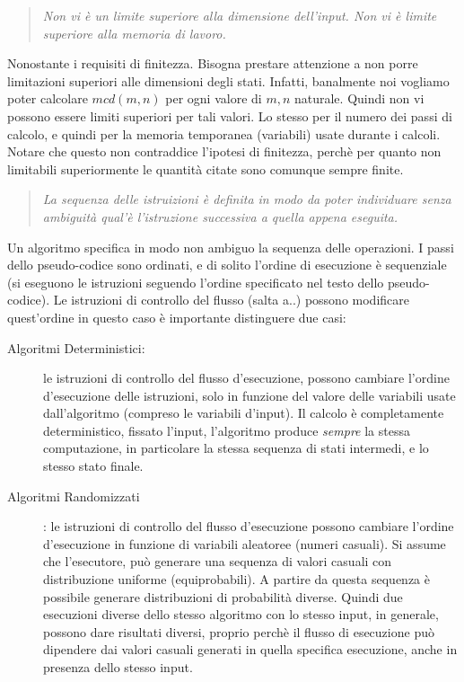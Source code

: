 \begin{quote} \emph{Non vi è un limite superiore alla dimensione
    dell'input. Non vi è limite superiore alla memoria di lavoro.}
\end{quote}

Nonostante i requisiti di finitezza. Bisogna prestare attenzione a non
porre limitazioni superiori alle dimensioni degli stati. Infatti,
banalmente noi vogliamo poter calcolare $mcd(m,n)$ per ogni valore di
$m,n$ naturale. Quindi non vi possono essere limiti superiori per tali
valori. Lo stesso per il numero dei passi di calcolo, e quindi per la
memoria temporanea (variabili) usate durante i calcoli. Notare che
questo non contraddice l'ipotesi di finitezza, perchè per quanto non
limitabili superiormente le quantità citate sono comunque sempre
finite.

\begin{quote} \emph{La sequenza delle istruizioni è definita in modo
    da poter individuare senza ambiguità qual'è l'istruzione
    successiva a quella appena eseguita.}
\end{quote}

Un algoritmo specifica in modo non ambiguo la sequenza delle
operazioni. I passi dello pseudo-codice sono ordinati, e di solito
l'ordine di esecuzione è sequenziale (si eseguono le istruzioni
seguendo l'ordine specificato nel testo dello pseudo-codice). Le
istruzioni di controllo del flusso (salta a..) possono modificare
quest'ordine in questo caso è importante distinguere due casi:

\begin{description}
\item[Algoritmi Deterministici:] le istruzioni di controllo del flusso
  d'esecuzione, possono cambiare l'ordine d'esecuzione delle
  istruzioni, solo in funzione del valore delle variabili usate
  dall'algoritmo (compreso le variabili d'input). Il calcolo è
  completamente deterministico, fissato l'input, l'algoritmo produce
  \emph{sempre} la stessa computazione, in particolare la stessa
  sequenza di stati intermedi, e lo stesso stato finale.
\item[Algoritmi Randomizzati]: le istruzioni di controllo del flusso
  d'esecuzione possono cambiare l'ordine d'esecuzione in funzione di
  variabili aleatoree (numeri casuali). Si assume che l'esecutore, può
  generare una sequenza di valori casuali con distribuzione uniforme
  (equiprobabili). A partire da questa sequenza è possibile generare
  distribuzioni di probabilità diverse. Quindi due esecuzioni diverse
  dello stesso algoritmo con lo stesso input, in generale, possono
  dare risultati diversi, proprio perchè il flusso di esecuzione può
  dipendere dai valori casuali generati in quella specifica
  esecuzione, anche in presenza dello stesso input.
\end{description}

